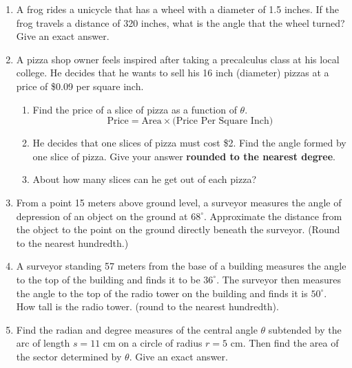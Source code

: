 \begin{enumerate}
\item A frog rides a unicycle that has a wheel with a diameter of 1.5 inches.  If the frog travels a distance of 320 inches, what is the angle that the wheel turned?  Give an exact answer.\vfill


\newpage


\item A pizza shop owner feels inspired after taking a precalculus class at his local college.  He decides that he wants to sell his 16 inch (diameter) pizzas at a price of \$0.09 per square inch.
\begin{enumerate}
\item Find the price of a slice of pizza as a function of $\theta$.
$$\text{Price}=\text{Area}\times \text{(Price Per Square Inch)}$$\vfill
\item He decides that one slices of pizza must cost \$2.  Find the angle formed by one slice of pizza.  Give your answer \textbf{rounded to the nearest degree}.\vfill
\item About how many slices can he get out of each pizza?\vfill

\end{enumerate}




\item From a point 15 meters above ground level, a surveyor measures the angle of depression of an object on the ground at $68^\circ$.  Approximate the distance from the object to the point on the ground directly beneath the surveyor. (Round to the nearest hundredth.) \vfill
\newpage

\item A surveyor standing 57 meters from the base of a building measures the angle to the top of the building and finds it to be $36^\circ$.  The surveyor then measures the angle to the top of the radio tower on the building and finds it is $50^\circ$.  How tall is the radio tower.  (round to the nearest hundredth).\vfill

\item Find the radian and degree measures of the central angle $\theta$ subtended by the arc of length $s=11$ cm on a circle of radius $r=5$ cm.  Then find the area of the sector determined by $\theta.$  Give an exact answer.\vfill


\end{enumerate}

